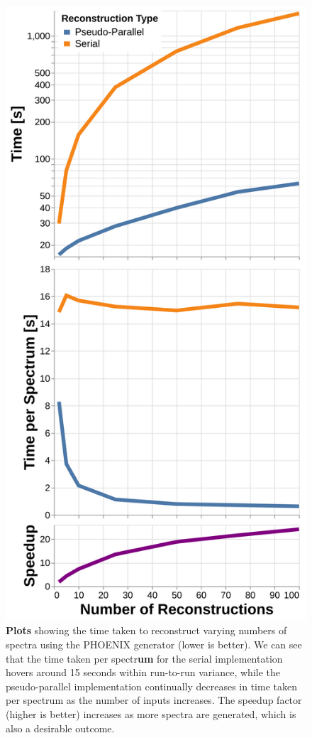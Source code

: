 \documentclass[twocolumn, linenumbers]{aastex631}
\begin{document}
\begin{figure}[t!]
    \centering
    \includegraphics[width=\columnwidth]{figure6}
    \caption{\textbf{Plots} showing the time taken to reconstruct varying numbers of spectra using the PHOENIX generator (lower is better).
    We can see that the time taken per spectr\textbf{um} for the serial implementation hovers around 15 seconds within run-to-run variance, while the pseudo-parallel implementation continually decreases in time taken per spectrum as the number of inputs increases.
    The speedup factor (higher is better) increases as more spectra are generated, which is also a desirable outcome.}
    \label{fig:figure6}
\end{figure}
\end{document}
